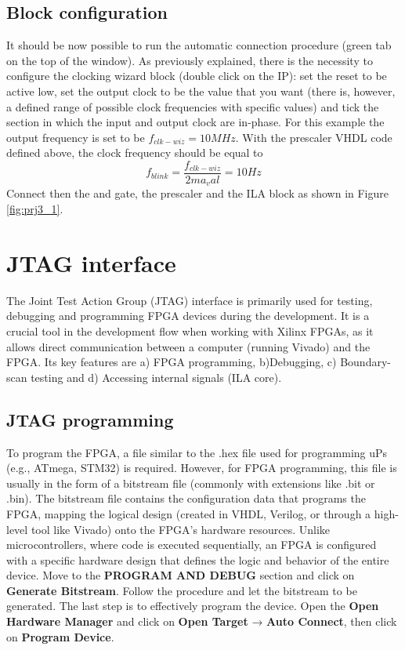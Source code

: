 \subsection{Block configuration}
It should be now possible to run the automatic connection procedure (green tab on the top of the window). As previously explained, there is the necessity to configure the clocking wizard block (double click on the IP): set the reset to be active low, set the output clock to be the
value that you want (there is, however, a defined range of possible clock frequencies with specific values) and tick the section in which the input and output clock are in-phase. For this example the output frequency is set to be $f_{clk-wiz} = 10MHz$. With the prescaler VHDL code defined above, the clock frequency should be equal to
\begin{equation}
	f_{blink} = \frac{f_{clk-wiz}}{2ma_val} = 10Hz
\end{equation} 
Connect then the and gate, the prescaler and the ILA block as shown in Figure \ref{fig:prj3_1}.



\section{JTAG interface}
The Joint Test Action Group (JTAG) interface is primarily used for testing, debugging and programming FPGA devices during the development. It is a crucial tool in the development flow when working with Xilinx FPGAs, as it allows direct communication between a computer (running Vivado) and the FPGA. Its key features are a) FPGA programming, b)Debugging, c) Boundary-scan testing and d) Accessing internal signals (ILA core).

\subsection{JTAG programming}
To program the FPGA, a file similar to the .hex file used for programming uPs (e.g., ATmega, STM32) is required. However, for FPGA programming, this file is usually in the form of a bitstream file (commonly with extensions like .bit or .bin). The bitstream file contains the configuration data that programs the FPGA, mapping the logical design (created in VHDL, Verilog, or through a high-level tool like Vivado) onto the FPGA's hardware resources. Unlike microcontrollers, where code is executed sequentially, an FPGA is configured with a specific hardware design that defines the logic and behavior of the entire device. Move to the \textbf{PROGRAM AND DEBUG} section and click on \textbf{Generate Bitstream}. Follow the procedure and let the bitstream to be generated. The last step is to effectively program the device. Open the \textbf{Open Hardware Manager} and click on \textbf{Open Target} → \textbf{Auto Connect}, then click on \textbf{Program Device}.

